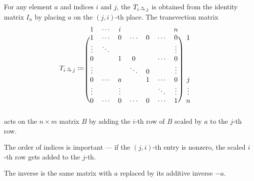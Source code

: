 \begin{definition}
\begin{thmenum}
     For any element \( a \) and indices \( i \) and \( j \), the  \( T_{i \reloset a \to j} \) is obtained from the identity matrix \( I_n \) by placing \( a \) on the \( (j, i) \)-th place. The transvection matrix
    \begin{equation*}
      T_{i \reloset a \to j}
      \coloneqq
      \begin{blockarray}{*{7}{c} c}
        1      & \cdots & i       &        &        &        & n      &        \\
      \begin{block}{(*{7}{c}) c}
        1      & \cdots & 0       & \cdots & 0      & \cdots & 0      & 1      \\
        \vdots & \ddots &         &        &        &        & \vdots &        \\
        0      &        & 1       & 0      &        & \cdots & 0      &        \\
        \vdots &        &         & \ddots & 0      &        & \vdots &        \\
        0      & \cdots & a       &        & 1      & \cdots & 0      & j      \\
        \vdots &        & \vdots  &        &        & \ddots & \vdots & \vdots \\
        0      & \cdots & 0       & \cdots & 0      & \cdots & 1      & n      \\
      \end{block}
      \end{blockarray}
    \end{equation*}
    acts on the \( n \times m \) matrix \( B \) by adding the \( i \)-th row of \( B \) scaled by \( a \) to the \( j \)-th row.

    The order of indices is important --- if the \( (j, i) \)-th entry is nonzero, the scaled \( i \)-th row gets added to the \( j \)-th.

    The inverse is the same matrix with \( a \) replaced by its additive inverse \( -a \).
  \end{thmenum}
\end{definition}

